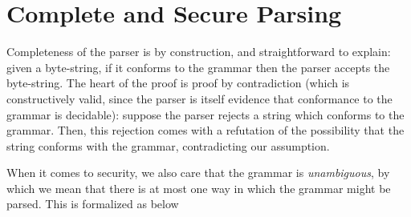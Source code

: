 \documentclass[11pt]{article}
\begin{document}
\section{Complete and Secure Parsing}
\label{sec:org0321583}

Completeness of the parser is by construction, and straightforward to explain:
given a byte-string, if it conforms to the grammar then the parser accepts the
byte-string. The heart of the proof is proof by contradiction (which is
constructively valid, since the parser is itself evidence that conformance to
the grammar is decidable): suppose the parser rejects a string which conforms
to the grammar. Then, this rejection comes with a refutation of the
possibility that the string conforms with the grammar, contradicting our
assumption.

When it comes to security, we also care that the grammar is \emph{unambiguous},
by which we mean that there is at most one way in which the grammar might be
parsed.
This is formalized as  below
\end{document}
